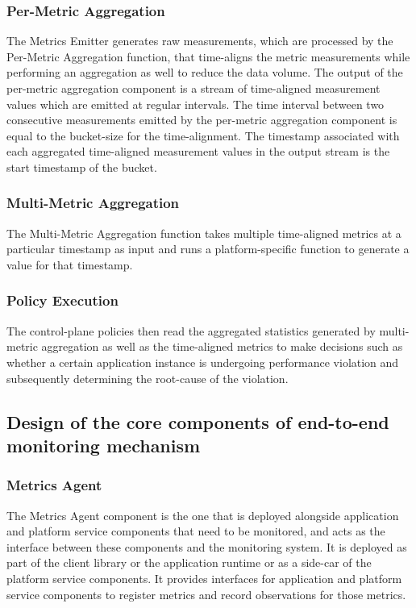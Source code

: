 \subsubsection{Per-Metric Aggregation}
The Metrics Emitter generates raw measurements, which are processed by the Per-Metric Aggregation function, that time-aligns the metric measurements while performing an aggregation as well to reduce the data volume. The output of the per-metric aggregation component is a stream of time-aligned measurement values which are emitted at regular intervals. The time interval between two consecutive measurements emitted by the per-metric aggregation component is equal to the bucket-size for the time-alignment. The timestamp associated with each aggregated time-aligned measurement values in the output stream is the start timestamp of the bucket.

\subsubsection{Multi-Metric Aggregation}
The Multi-Metric Aggregation function takes multiple time-aligned metrics at a particular timestamp as input and runs a platform-specific function to generate a value for that timestamp. 

\subsubsection{Policy Execution}
The control-plane policies then read the aggregated statistics generated by multi-metric aggregation as well as the time-aligned metrics to make decisions such as whether a certain application instance is undergoing performance violation and subsequently determining the root-cause of the violation.

\subsection{Design of the core components of end-to-end monitoring mechanism}
\subsubsection{Metrics Agent}
The Metrics Agent component is the one that is deployed alongside application and platform service components that need to be monitored, and acts as the interface between these components and the monitoring system. It is deployed as part of the client library or the application runtime or as a side-car of the platform service components. It provides interfaces for application and platform service components to register metrics and record observations for those metrics. 

